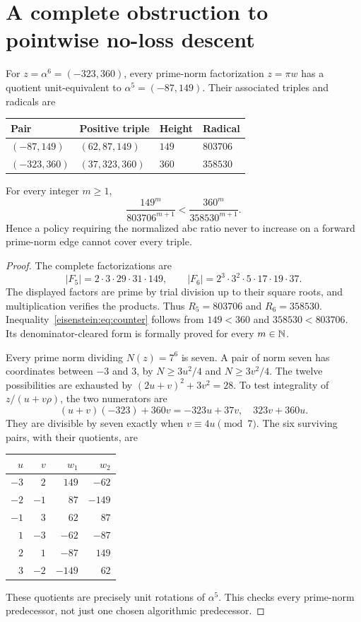 \section{A complete obstruction to pointwise no-loss descent}\label{eisenstein:sec:counter}
\begin{theorem}\label{eisenstein:thm:counter}
For $z=\alpha^6=(-323,360)$, every prime-norm factorization $z=\pi w$ has a quotient unit-equivalent to $\alpha^5=(-87,149)$. Their associated triples and radicals are
\begin{center}
\begin{tabular}{@{}llll@{}}
\toprule
Pair & Positive triple & Height & Radical\\\midrule
$(-87,149)$ & $(62,87,149)$ & $149$ & $803706$\\
$(-323,360)$ & $(37,323,360)$ & $360$ & $358530$\\\bottomrule
\end{tabular}
\end{center}
For every integer $m\ge1$,
\begin{equation}\label{eisenstein:eq:counter}
\frac{149^m}{803706^{m+1}}<\frac{360^m}{358530^{m+1}}.
\end{equation}
Hence a policy requiring the normalized abc ratio never to increase on a forward prime-norm edge cannot cover every triple.
\end{theorem}
\begin{proof}
The complete factorizations are
\[
|F_5|=2\cdot3\cdot29\cdot31\cdot149,
\qquad |F_6|=2^3\cdot3^2\cdot5\cdot17\cdot19\cdot37.
\]
The displayed factors are prime by trial division up to their square roots, and multiplication verifies the products. Thus $R_5=803706$ and $R_6=358530$. Inequality~\eqref{eisenstein:eq:counter} follows from $149<360$ and $358530<803706$. Its denominator-cleared form is formally proved for every $m\in\mathbb N$.

Every prime norm dividing $N(z)=7^6$ is seven. A pair of norm seven has coordinates between $-3$ and $3$, by $N\ge3u^2/4$ and $N\ge3v^2/4$. The twelve possibilities are exhausted by $(2u+v)^2+3v^2=28$. To test integrality of $z/(u+v\rho)$, the two numerators are
\[
(u+v)(-323)+360v=-323u+37v,
\quad 323v+360u.
\]
They are divisible by seven exactly when $v\equiv4u\pmod7$. The six surviving pairs, with their quotients, are
\begin{center}
\begin{tabular}{@{}rr@{\qquad}rr@{}}
\toprule
$u$&$v$&$w_1$&$w_2$\\\midrule
$-3$&$2$&$149$&$-62$\\
$-2$&$-1$&$87$&$-149$\\
$-1$&$3$&$62$&$87$\\
$1$&$-3$&$-62$&$-87$\\
$2$&$1$&$-87$&$149$\\
$3$&$-2$&$-149$&$62$\\\bottomrule
\end{tabular}
\end{center}
These quotients are precisely unit rotations of $\alpha^5$. This checks every prime-norm predecessor, not just one chosen algorithmic predecessor.
\end{proof}

